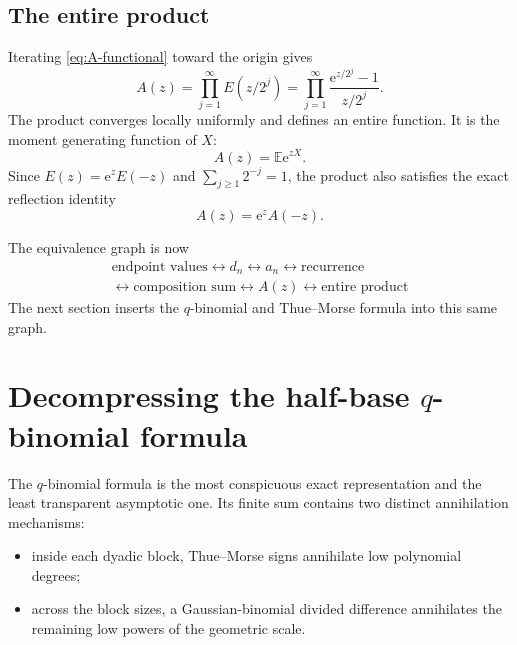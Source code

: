\documentclass[11pt,oneside]{article}
\theoremstyle{definition}
\theoremstyle{remark}
\newcommand{\e}{\mathrm e}
\newcommand{\E}{\mathbb E}
\begin{document}
\subsection{The entire product}

Iterating \eqref{eq:A-functional} toward the origin gives
\begin{equation}
 \boxed{
 A(z)=\prod_{j=1}^{\infty}E(z/2^j)
 =\prod_{j=1}^{\infty}\frac{\e^{z/2^j}-1}{z/2^j}.}         \label{eq:A-product}
\end{equation}
The product converges locally uniformly and defines an entire function.  It is the moment
generating function of $X$:
\begin{equation}
 A(z)=\E\e^{zX}.                                            \label{eq:A-mgf}
\end{equation}
Since $E(z)=\e^zE(-z)$ and $\sum_{j\ge1}2^{-j}=1$, the product also satisfies the exact
reflection identity
\begin{equation}
 A(z)=\e^zA(-z).                                             \label{eq:A-reflection}
\end{equation}

The equivalence graph is now
\begin{equation*}
 \boxed{\begin{gathered}
 \text{endpoint values}\longleftrightarrow d_n\longleftrightarrow a_n
 \longleftrightarrow\text{recurrence}\\
 \longleftrightarrow\text{composition sum}\longleftrightarrow A(z)
 \longleftrightarrow\text{entire product}
 \end{gathered}}
\end{equation*}
The next section inserts the $q$-binomial and Thue--Morse formula into this same graph.

\section{Decompressing the half-base \texorpdfstring{$q$}{q}-binomial formula}
\label{sec:q-decompression}

The $q$-binomial formula is the most conspicuous exact representation and the least transparent
asymptotic one.  Its finite sum contains two distinct annihilation mechanisms:

\begin{itemize}
\item inside each dyadic block, Thue--Morse signs annihilate low polynomial degrees;
\item across the block sizes, a Gaussian-binomial divided difference annihilates the remaining
low powers of the geometric scale.
\end{itemize}
\end{document}
